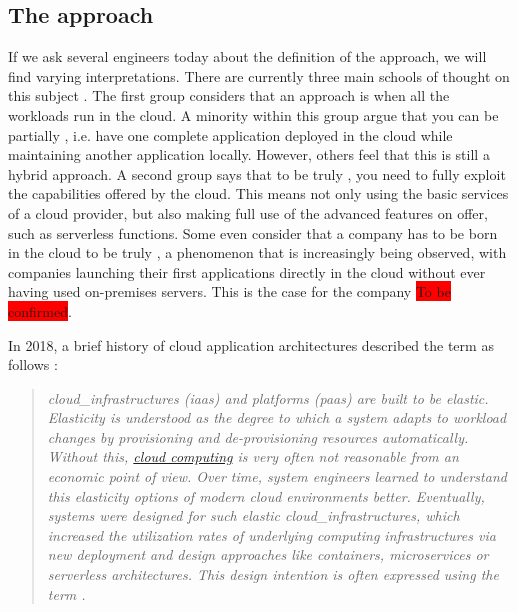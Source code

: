 \subsection{The \texorpdfstring{}{} approach}
If we ask several engineers today about the definition of the  approach, we will find varying interpretations. There are currently three main schools of thought on this subject \cite{history_cloud_native}. The first group considers that an approach is  when all the workloads run in the \gls{cloud}. A minority within this group argue that you can be partially , i.e. have one complete application deployed in the \gls{cloud} while maintaining another application locally. However, others feel that this is still a hybrid approach. A second group says that to be truly , you need to fully exploit the capabilities offered by the \gls{cloud}. This means not only using the basic services of a \gls{cloud} provider, but also making full use of the advanced features on offer, such as serverless functions. Some even consider that a company has to be born in the \gls{cloud} to be truly , a phenomenon that is increasingly being observed, with companies launching their first applications directly in the \gls{cloud} without ever having used on-premises servers. This is the case for the company  \colorbox{red}{To be confirmed}. \cite{history_cloud_native}

In 2018, a brief history of \gls{cloud} application architectures described the term  as follows :
\begin{quote}
    \textit{\Glspl{cloud_infrastructure} (\acrshort{iaas}) and platforms (\acrshort{paas}) are built to be elastic. Elasticity is understood as the degree to which a system adapts to workload changes by provisioning and de-provisioning resources automatically. Without this, \hyperref[subsec:cloudcomputing]{cloud computing} is very often not reasonable from an economic point of view. Over time, system engineers learned to understand this elasticity options of modern \gls{cloud} environments better. Eventually, systems were designed for such elastic \glspl{cloud_infrastructure}, which increased the utilization rates of underlying computing infrastructures via new deployment and design approaches like containers, microservices or serverless architectures. This design intention is often expressed using the term . \cite{history_cloud_application}}
\end{quote}


